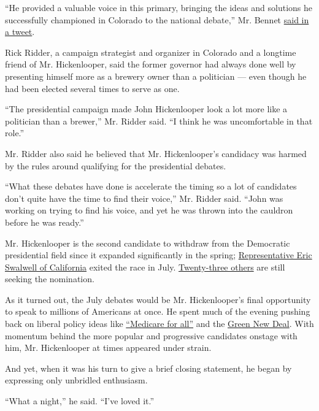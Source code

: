 ``He provided a valuable voice in this primary, bringing the ideas and
solutions he successfully championed in Colorado to the national
debate,'' Mr. Bennet
\href{https://twitter.com/MichaelBennet/status/1162053029417377792}{said
in a tweet}.

Rick Ridder, a campaign strategist and organizer in Colorado and a
longtime friend of Mr. Hickenlooper, said the former governor had always
done well by presenting himself more as a brewery owner than a
politician --- even though he had been elected several times to serve as
one.

``The presidential campaign made John Hickenlooper look a lot more like
a politician than a brewer,'' Mr. Ridder said. ``I think he was
uncomfortable in that role.''

Mr. Ridder also said he believed that Mr. Hickenlooper's candidacy was
harmed by the rules around qualifying for the presidential debates.

``What these debates have done is accelerate the timing so a lot of
candidates don't quite have the time to find their voice,'' Mr. Ridder
said. ``John was working on trying to find his voice, and yet he was
thrown into the cauldron before he was ready.''

Mr. Hickenlooper is the second candidate to withdraw from the Democratic
presidential field since it expanded significantly in the spring;
\href{https://www.nytimes.com/2019/07/08/us/politics/steyer-swalwell-2020.html}{Representative
Eric Swalwell of California} exited the race in July.
\href{https://www.nytimes.com/interactive/2019/us/politics/2020-presidential-candidates.html}{Twenty-three
others} are still seeking the nomination.

As it turned out, the July debates would be Mr. Hickenlooper's final
opportunity to speak to millions of Americans at once. He spent much of
the evening pushing back on liberal policy ideas like
\href{https://www.nytimes.com/2019/06/23/us/politics/2020-democrats-medicare-for-all-public-option.html}{``Medicare
for all''} and the
\href{https://www.nytimes.com/2019/02/21/climate/green-new-deal-questions-answers.html}{Green
New Deal}. With momentum behind the more popular and progressive
candidates onstage with him, Mr. Hickenlooper at times appeared under
strain.

And yet, when it was his turn to give a brief closing statement, he
began by expressing only unbridled enthusiasm.

``What a night,'' he said. ``I've loved it.''

